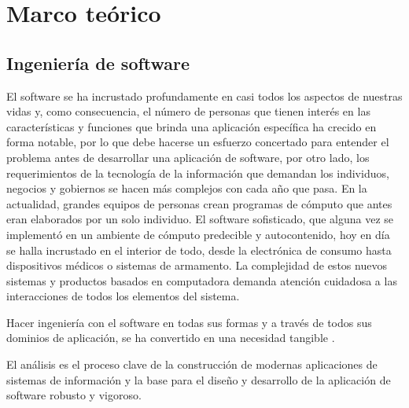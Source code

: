 \chapter{Marco teórico}

\section{Ingeniería de software}


El software se ha incrustado profundamente en casi todos los aspectos de nuestras vidas y, como consecuencia, el número de personas que tienen interés en las características y funciones que brinda una aplicación específica ha crecido en forma notable, por lo que debe hacerse un esfuerzo concertado para entender el problema antes de desarrollar una aplicación de software, por otro lado, los requerimientos de la tecnología de la información que demandan los individuos, negocios y gobiernos se hacen más complejos con cada año que pasa. En la actualidad, grandes equipos de personas crean programas de cómputo que antes eran elaborados por un solo individuo. El software sofisticado, que alguna vez se implementó en un ambiente de cómputo predecible y autocontenido, hoy en día se halla incrustado en el interior de todo, desde la electrónica de consumo hasta dispositivos médicos o sistemas de armamento. La complejidad de estos nuevos sistemas y productos basados en computadora demanda atención cuidadosa a las interacciones de todos los elementos del sistema.

Hacer ingeniería con el software en todas sus formas y a través de todos sus dominios de aplicación, se ha convertido en una necesidad tangible . 

El análisis es el proceso clave de la construcción de modernas aplicaciones de sistemas de información y la base para el diseño y desarrollo de la aplicación de software robusto y vigoroso. 